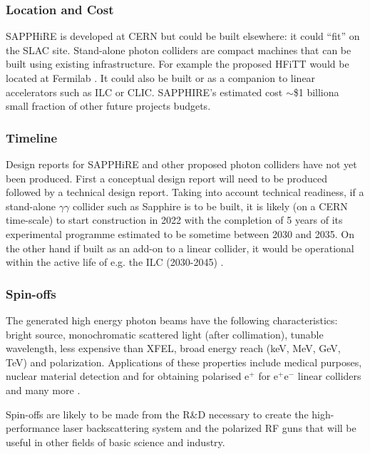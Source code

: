 \subsubsection{Location and Cost}
SAPPHiRE is developed at CERN but could be built elsewhere: it could ``fit'' on the SLAC site. Stand-alone photon colliders are compact machines that can be built using existing infrastructure. For example the proposed HFiTT would be located at Fermilab \cite{Chou:Higgs}. It could also be built or as a companion to linear accelerators such as ILC or CLIC. SAPPHIRE's estimated cost $\sim$\$1 billion\textemdash a small fraction of other future projects budgets. 

\subsubsection{Timeline}
Design reports for SAPPHiRE and other proposed photon colliders have not yet been produced. First a conceptual design report will need to be produced followed by a technical design report. 
Taking into account technical readiness, if a stand-alone $\gamma\gamma$ collider such as Sapphire is to be built, it is likely (on a CERN time-scale) to start construction in 2022 with the completion of 5 years of its experimental programme estimated to be sometime between 2030 and 2035. On the other hand if built as an add-on to a linear collider, it would be operational within the active life of e.g. the ILC (2030-2045) \cite{Blondel:HiggsF}.

\subsubsection{Spin-offs}
The generated high energy photon beams have the following characteristics: bright source, monochromatic scattered light (after collimation), tunable wavelength, less expensive than XFEL, broad energy reach (keV, MeV, GeV, TeV) and polarization. Applications of these properties include medical purposes, nuclear material detection and for obtaining polarised e$^{+}$ for e$^{+}$e$^{-}$ linear colliders and many more \cite{Telnov:Overview}.

Spin-offs are likely to be made from the R\&D necessary to create the high-performance laser backscattering system and the polarized RF guns that will be useful in other fields of basic science and industry.

